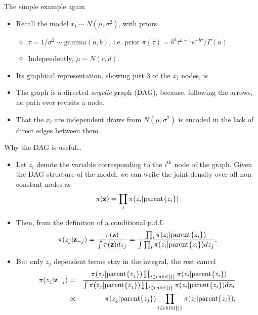 \documentclass{beamer}
\newcommand{\eps}[3]
{{\begin{center}
 \rotatebox{#1}{\scalebox{#2}{\texttt{[image: \#3]}}}
 \end{center}}
}
\begin{document}
\begin{frame}{The simple example again}
\begin{itemize}
\item Recall the model $x_i \sim N(\mu, \sigma^2)$, with priors
\begin{itemize}
\item $\tau = 1/\sigma^2 \sim \text{gamma}(a,b)$, i.e. prior $\pi(\tau) = b^a \tau^{a-1} e^{-b\tau}/\Gamma(a)$ 
\item Independently, $\mu \sim N(c,d)$.
\end{itemize}
\item Its graphical representation, showing just 3 of the $x_i $ nodes, is
\eps{-90}{.4}{norm-dag.eps}
\item The graph is a directed {\em acyclic } graph (DAG), because, following the arrows, no path ever revisits a node.
\item That the $x_i$ are independent draws from $ N(\mu, \sigma^2)$ is encoded in the lack of direct edges between them.
\end{itemize}
\end{frame}

\begin{frame}{Why the DAG is useful\ldots}
\begin{itemize}
\item Let $z_i$ denote the variable corresponding to the $i^\text{th}$ node of the graph. Given the DAG structure of the model, we can write the joint density over all non-constant nodes as 
$$
\pi({\bf z}) = \prod_{i} \pi (z_i|\text{parent}\{z_i\})
$$
\item Then, from the definition of a conditional p.d.f.
$$
\pi(z_j|{\bf z}_{-j}) = \frac{\pi({\bf z})}{\int \pi({\bf z}) d z_{j}} = \frac{\prod_{i} \pi(z_i|\text{parent}\{z_i\})}{
\int \prod_{i} \pi(z_i|\text{parent}\{z_i\}) dz_j},
$$ 
\item But only $z_j$ dependent terms stay in the integral, the rest cancel
\begin{eqnarray*}
\pi(z_j|{\bf z}_{-j}) &=&  \frac{\pi(z_j|\text{parent}\{z_j\})\prod_{i \in \text{child\{j\}}}\pi(z_i|\text{parent}\{z_i\})}
{\int \pi(z_j|\text{parent}\{z_j\})\prod_{i \in \text{child\{j\}}}\pi(z_i|\text{parent}\{z_i\}) dz_j}\\
&\propto & \pi(z_j|\text{parent}\{z_j\})\prod_{i \in \text{child\{j\}}}\pi(z_i|\text{parent}\{z_i\}),
\end{eqnarray*}
\end{itemize}
\end{frame}
\end{document}
